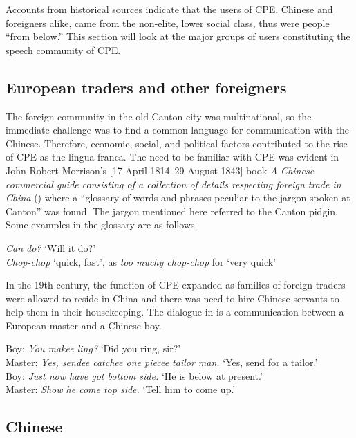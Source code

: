 \documentclass[english,output=paper,colorlinks,citecolor=brown]{../langscibook}
\begin{document}
Accounts from historical sources indicate that the users of CPE, Chinese and foreigners alike, came from the non-elite, lower social class, thus were people “from below.” This section will look at the major groups of users constituting the speech community of CPE. 

\subsection{European traders and other foreigners}\label{sec:7:4.1}

The foreign community in the old Canton city was multinational, so the immediate challenge was to find a common language for communication with the Chinese. Therefore, economic, social, and political factors contributed to the rise of CPE as the lingua franca. The need to be familiar with CPE was evident in John Robert Morrison’s [17 April 1814--29 August 1843] book \textit{A Chinese commercial guide consisting of a collection of details respecting foreign trade in China} (\citeyear{Morrison1834}) where a “glossary of words and phrases peculiar to the jargon spoken at Canton” was found. The jargon mentioned here referred to the Canton pidgin. Some examples in the glossary are as follows.

\ea 
    \label{ex:7:1}
    \textit{Can do?} ‘Will it do?’\\
    \textit{Chop-chop} ‘quick, fast’, as \textit{too muchy chop-chop} for ‘very quick’
\z

In the 19th century, the function of CPE expanded as families of foreign traders were allowed to reside in China and there was need to hire Chinese servants to help them in their housekeeping. The dialogue in  is a communication between a European master and a Chinese boy. 

\ea \label{ex:7:2}
Boy: \textit{You makee ling?} ‘Did you ring, sir?’\\
Master: \textit{Yes, sendee catchee one piecee tailor man.} ‘Yes, send for a tailor.’\\
Boy: \textit{Just now have got bottom side.} ‘He is below at present.’\\
Master: \textit{Show he come top side.} ‘Tell him to come up.’\\

\citep[43]{Anonymous1860}
\z

\subsection{Chinese}\label{sec:7:4.2}
\end{document}
